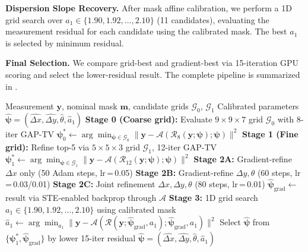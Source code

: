 \documentclass[runningheads]{llncs}
\begin{document}
\textbf{Dispersion Slope Recovery.}
After mask affine calibration, we perform a 1D grid search over $a_1 \in \{1.90, 1.92, \ldots, 2.10\}$ (11 candidates), evaluating the measurement residual for each candidate using the calibrated mask.
The best $a_1$ is selected by minimum residual.

\textbf{Final Selection.}
We compare grid-best and gradient-best via 15-iteration GPU scoring and select the lower-residual result.
The complete pipeline is summarized in .

\begin{algorithm}[t]
\caption{Two-Stage Differentiable CASSI Calibration}
\label{alg:calibration}
\begin{algorithmic}[1]
\REQUIRE Measurement $\mathbf{y}$, nominal mask $\mathbf{m}$, candidate grids $\mathcal{G}_0$, $\mathcal{G}_1$
\ENSURE Calibrated parameters $\hat{\boldsymbol{\psi}} = (\widehat{\Delta x}, \widehat{\Delta y}, \hat{\theta}, \hat{a}_1)$
\STATE \textbf{Stage 0 (Coarse grid):} Evaluate $9{\times}9{\times}7$ grid $\mathcal{G}_0$ with 8-iter GAP-TV
\STATE $\boldsymbol{\psi}_0^* \leftarrow \arg\min_{\boldsymbol{\psi} \in \mathcal{G}_0} \|\mathbf{y} - \mathcal{A}(\mathcal{R}_8(\mathbf{y}; \boldsymbol{\psi}); \boldsymbol{\psi})\|^2$
\STATE \textbf{Stage 1 (Fine grid):} Refine top-5 via $5{\times}5{\times}3$ grid $\mathcal{G}_1$, 12-iter GAP-TV
\STATE $\boldsymbol{\psi}_1^* \leftarrow \arg\min_{\boldsymbol{\psi} \in \mathcal{G}_1} \|\mathbf{y} - \mathcal{A}(\mathcal{R}_{12}(\mathbf{y}; \boldsymbol{\psi}); \boldsymbol{\psi})\|^2$
\STATE \textbf{Stage 2A:} Gradient-refine $\Delta x$ only (50 Adam steps, lr\,=\,0.05)
\STATE \textbf{Stage 2B:} Gradient-refine $\Delta y, \theta$ (60 steps, lr\,=\,0.03/0.01)
\STATE \textbf{Stage 2C:} Joint refinement $\Delta x, \Delta y, \theta$ (80 steps, lr\,=\,0.01)
\STATE $\hat{\boldsymbol{\psi}}_{\text{grad}} \leftarrow$ result via STE-enabled backprop through $\mathcal{A}$
\STATE \textbf{Stage 3:} 1D grid search $a_1 \in \{1.90, 1.92, \ldots, 2.10\}$ using calibrated mask
\STATE $\hat{a}_1 \leftarrow \arg\min_{a_1} \|\mathbf{y} - \mathcal{A}(\mathcal{R}(\mathbf{y}; \hat{\boldsymbol{\psi}}_{\text{grad}}, a_1); \hat{\boldsymbol{\psi}}_{\text{grad}}, a_1)\|^2$
\STATE Select $\hat{\boldsymbol{\psi}}$ from $\{\boldsymbol{\psi}_1^*, \hat{\boldsymbol{\psi}}_{\text{grad}}\}$ by lower 15-iter residual
\RETURN $\hat{\boldsymbol{\psi}} = (\widehat{\Delta x}, \widehat{\Delta y}, \hat{\theta}, \hat{a}_1)$
\end{algorithmic}
\end{algorithm}
\end{document}
